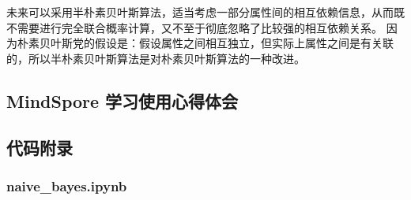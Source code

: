 \documentclass[12pt]{article}
\begin{document}
未来可以采用半朴素贝叶斯算法，适当考虑一部分属性间的相互依赖信息，从而既不需要进行完全联合概率计算，又不至于彻底忽略了比较强的相互依赖关系。
因为朴素贝叶斯党的假设是：假设属性之间相互独立，但实际上属性之间是有关联的，所以半朴素贝叶斯算法是对朴素贝叶斯算法的一种改进。


\subsection{MindSpore 学习使用心得体会}

\subsection{代码附录}
\subsubsection{naive\_bayes.ipynb}
\end{document}
